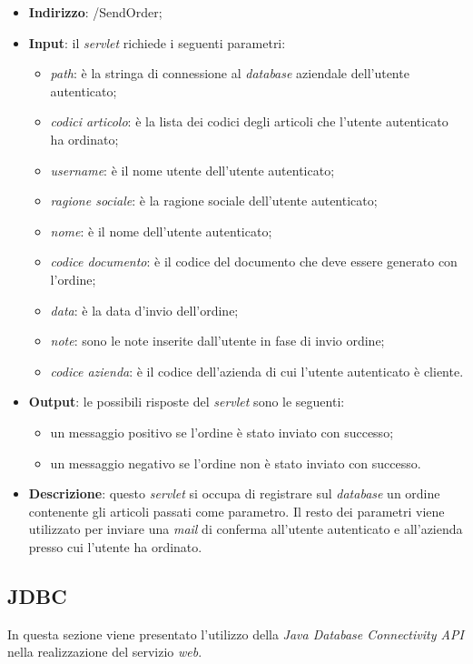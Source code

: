 \begin{itemize}
	\item \textbf{Indirizzo}: /SendOrder;
	\item \textbf{Input}: il \textit{servlet} richiede i seguenti parametri:
		\begin{itemize}
			\item \textit{path}: è la stringa di connessione al \textit{database} aziendale dell'utente autenticato;
			\item \textit{codici articolo}: è la lista dei codici degli articoli che l'utente autenticato ha ordinato;
			\item \textit{username}: è il nome utente dell'utente autenticato;
			\item \textit{ragione sociale}: è la ragione sociale dell'utente autenticato;
			\item \textit{nome}: è il nome dell'utente autenticato;
			\item \textit{codice documento}: è il codice del documento che deve essere generato con l'ordine;
			\item \textit{data}: è la data d'invio dell'ordine;
			\item \textit{note}: sono le note inserite dall'utente in fase di invio ordine;
			\item \textit{codice azienda}: è il codice dell'azienda di cui l'utente autenticato è cliente.
		\end{itemize}
	\item \textbf{Output}: le possibili risposte del \textit{servlet} sono le seguenti:
		\begin{itemize}
			\item un messaggio positivo se l'ordine è stato inviato con successo;
			\item un messaggio negativo se l'ordine non è stato inviato con successo.
		\end{itemize}
	\item \textbf{Descrizione}: questo \textit{servlet} si occupa di registrare sul \textit{database} un ordine contenente gli articoli passati come parametro. Il resto dei parametri viene utilizzato per inviare una \textit{mail} di conferma all'utente autenticato e all'azienda presso cui l'utente ha ordinato.
\end{itemize}
\subsection{JDBC}

In questa sezione viene presentato l'utilizzo della \textit{Java Database Connectivity API} nella realizzazione del servizio \textit{web}.

